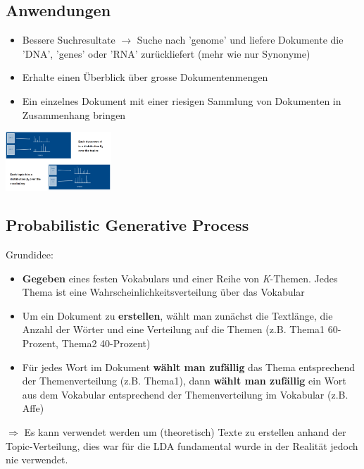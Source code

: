 \documentclass{article}
\newenvironment{Figure}
	{\par\medskip\noindent\minipage{\linewidth}}
	{\endminipage\par\medskip}
\theoremstyle{merke}
\theoremstyle{definition}
\begin{document}
        \subsection{Anwendungen}
        \begin{itemize}
            \item Bessere Suchresultate $\rightarrow$ Suche nach 'genome' und liefere Dokumente die 'DNA', 'genes' oder 'RNA' zurückliefert (mehr wie nur Synonyme)
            \item Erhalte einen Überblick über grosse Dokumentenmengen
            \item Ein einzelnes Dokument mit einer riesigen Sammlung von Dokumenten in Zusammenhang bringen 
        \end{itemize}

        \begin{Figure}
        \centering
        \includegraphics[width=150px]{img/ProbabilisticTopicModel.png}
            \label{fig:Probabilistic Topic Model}
        \end{Figure}

	    \subsection{Probabilistic Generative Process}
        Grundidee:
        \begin{itemize}
            \item \textbf{Gegeben} eines festen Vokabulars und einer Reihe von \textit{K}-Themen. Jedes Thema ist eine Wahrscheinlichkeitsverteilung über das Vokabular
            \item Um ein Dokument zu \textbf{erstellen}, wählt man zunächst die Textlänge, die Anzahl der Wörter und eine Verteilung auf die Themen (z.B. Thema1 60-Prozent, Thema2 40-Prozent)
            \item Für jedes Wort im Dokument \textbf{wählt man zufällig} das Thema entsprechend der Themenverteilung (z.B. Thema1), dann \textbf{wählt man zufällig} ein Wort aus dem Vokabular entsprechend der Themenverteilung im Vokabular (z.B. Affe)
        \end{itemize}
        $\Rightarrow$ Es kann verwendet werden um (theoretisch) Texte zu erstellen anhand der Topic-Verteilung, dies war für die LDA fundamental wurde in der Realität jedoch nie verwendet.
\end{document}
